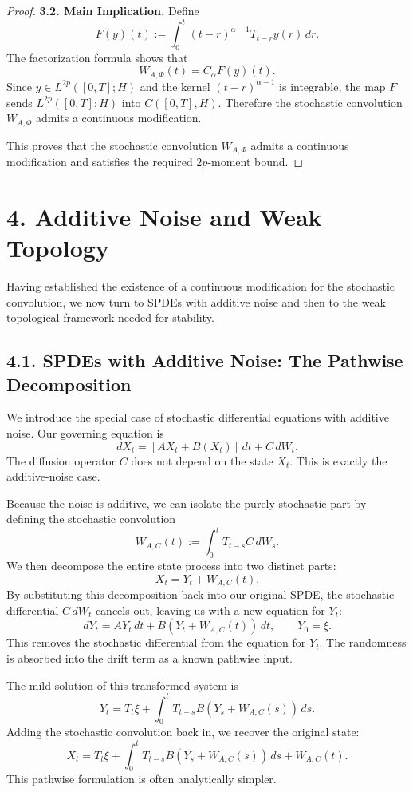 \documentclass[11pt]{article}
\theoremstyle{definition}
\theoremstyle{remark}
\begin{document}
\begin{proof}
\medskip

\noindent\textbf{3.2. Main Implication.}
Define
\[
F(y)(t):=\int_0^t (t-r)^{\alpha-1}T_{t-r}y(r)\,dr.
\]
The factorization formula shows that
\[
W_{A,\Phi}(t)=C_\alpha F(y)(t).
\]
Since \(y\in L^{2p}([0,T];H)\) and the kernel \((t-r)^{\alpha-1}\) is integrable, the map \(F\) sends \(L^{2p}([0,T];H)\) into \(C([0,T],H)\). Therefore the stochastic convolution \(W_{A,\Phi}\) admits a continuous modification.

\noindent This proves that the stochastic convolution \(W_{A,\Phi}\) admits a continuous modification and satisfies the required \(2p\)-moment bound.
\end{proof}

\section*{4. Additive Noise and Weak Topology}

Having established the existence of a continuous modification for the stochastic convolution, we now turn to SPDEs with additive noise and then to the weak topological framework needed for stability.

\subsection*{4.1. SPDEs with Additive Noise: The Pathwise Decomposition}
We introduce the special case of stochastic differential equations with additive noise. Our governing equation is
\[
dX_t=[AX_t+B(X_t)]\,dt+C\,dW_t.
\]
The diffusion operator \(C\) does not depend on the state \(X_t\). This is exactly the additive-noise case.

Because the noise is additive, we can isolate the purely stochastic part by defining the stochastic convolution
\[
W_{A,C}(t):=\int_0^t T_{t-s}C\,dW_s.
\]
We then decompose the entire state process into two distinct parts:
\[
X_t=Y_t+W_{A,C}(t).
\]
By substituting this decomposition back into our original SPDE, the stochastic differential \(C\,dW_t\) cancels out, leaving us with a new equation for \(Y_t\):
\[
dY_t=AY_t\,dt+B(Y_t+W_{A,C}(t))\,dt,
\qquad
Y_0=\xi.
\]
This removes the stochastic differential from the equation for \(Y_t\). The randomness is absorbed into the drift term as a known pathwise input.

The mild solution of this transformed system is
\[
Y_t=T_t\xi+\int_0^t T_{t-s}B(Y_s+W_{A,C}(s))\,ds.
\]
Adding the stochastic convolution back in, we recover the original state:
\[
X_t=T_t\xi+\int_0^t T_{t-s}B(Y_s+W_{A,C}(s))\,ds+W_{A,C}(t).
\]
This pathwise formulation is often analytically simpler.
\end{document}
